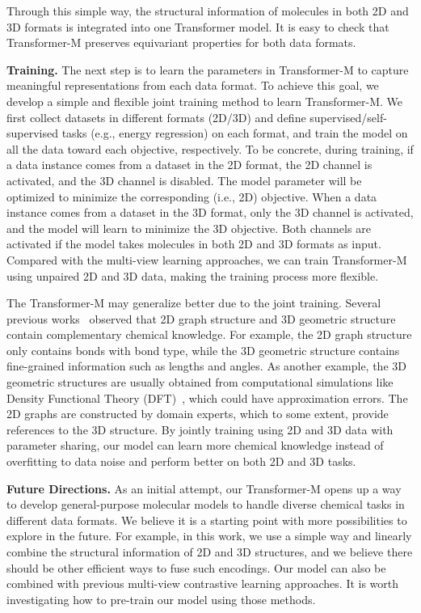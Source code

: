 \documentclass{article} \usepackage[dvipsnames]{xcolor}
\begin{document}
Through this simple way, the structural information of molecules in both 2D and 3D formats is integrated into one Transformer model. It is easy to check that Transformer-M preserves equivariant properties for both data formats. 

\textbf{Training.} The next step is to learn the parameters in Transformer-M to capture meaningful representations from each data format. To achieve this goal, we develop a simple and flexible joint training method to learn Transformer-M. We first collect datasets in different formats (2D/3D) and define supervised/self-supervised tasks (e.g., energy regression) on each format, and train the model on all the data toward each objective, respectively. To be concrete, during training, if a data instance comes from a dataset in the 2D format, the 2D channel is activated, and the 3D channel is disabled. The model parameter will be optimized to minimize the corresponding (i.e., 2D) objective. When a data instance comes from a dataset in the 3D format, only the 3D channel is activated, and the model will learn to minimize the 3D objective. Both channels are activated if the model takes molecules in both 2D and 3D formats as input. Compared with the multi-view learning approaches, we can train Transformer-M using unpaired 2D and 3D data, making the training process more flexible. 

The Transformer-M may generalize better due to the joint training. Several previous works~\citep{liu2021pre} observed that 2D graph structure and 3D geometric structure contain complementary chemical knowledge. For example, the 2D graph structure only contains bonds with bond type, while the 3D geometric structure contains fine-grained information such as lengths and angles. As another example, the 3D geometric structures are usually obtained from computational simulations like Density Functional Theory (DFT)~\citep{burke2012perspective}, which could have approximation errors. The 2D graphs are constructed by domain experts, which to some extent, provide references to the 3D structure. By jointly training using 2D and 3D data with parameter sharing, our model can learn more chemical knowledge instead of overfitting to data noise and perform better on both 2D and 3D tasks. 

\textbf{Future Directions.} As an initial attempt, our Transformer-M opens up a way to develop general-purpose molecular models to handle diverse chemical tasks in different data formats. We believe it is a starting point with more possibilities to explore in the future. For example, in this work, we use a simple way and linearly combine the structural information of 2D and 3D structures, and we believe there should be other efficient ways to fuse such encodings. Our model can also be combined with previous multi-view contrastive learning approaches. It is worth investigating how to pre-train our model using those methods.
\end{document}
